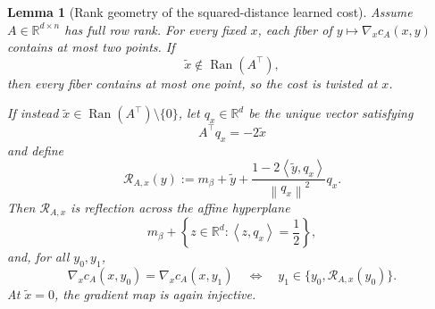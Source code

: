 \documentclass[11pt,a4paper]{article}
\newtheorem{lemma}[theorem]{Lemma}
\theoremstyle{definition}
\theoremstyle{remark}
\newcommand{\R}{\mathbb R}
\newcommand{\Ran}{\operatorname{Ran}}
\newcommand{\norm}[1]{\left\lVert #1\right\rVert}
\newcommand{\ip}[2]{\left\langle #1,#2\right\rangle}
\begin{document}
\begin{lemma}[Rank geometry of the squared-distance learned cost]
\label{lem:p2-rank-geometry}
Assume \(A\in\R^{d\times n}\) has full row rank.  For every fixed \(x\),
each fiber of
\(
 y\mapsto\nabla_xc_A(x,y)
\)
contains at most two points.  If
\begin{equation}
  \widetilde x\notin\Ran(A^\top),
  \label{eq:off-row-space}
\end{equation}
then every fiber contains at most one point, so the cost is twisted at
\(x\).

If instead \(\widetilde x\in\Ran(A^\top)\setminus\{0\}\), let
\(q_x\in\R^d\) be the unique vector satisfying
\begin{equation}
  A^\top q_x=-2\widetilde x
  \label{eq:p2-reflection-normal}
\end{equation}
and define
\begin{equation}
  \mathscr R_{A,x}(y)
  :=m_\beta+\widetilde y
    +\frac{1-2\ip{\widetilde y}{q_x}}{\norm{q_x}^2}q_x.
  \label{eq:p2-target-reflection}
\end{equation}
Then \(\mathscr R_{A,x}\) is reflection across the affine hyperplane
\begin{equation}
  m_\beta+\left\{z\in\R^d:\ip{z}{q_x}=\frac12\right\},
  \label{eq:p2-reflection-hyperplane}
\end{equation}
and, for all \(y_0,y_1\),
\begin{equation}
  \nabla_xc_A(x,y_0)=\nabla_xc_A(x,y_1)
  \quad\Longleftrightarrow\quad
  y_1\in\{y_0,\mathscr R_{A,x}(y_0)\}.
  \label{eq:p2-exact-reflection-fiber}
\end{equation}
At \(\widetilde x=0\), the gradient map is again injective.
\end{lemma}
\end{document}
